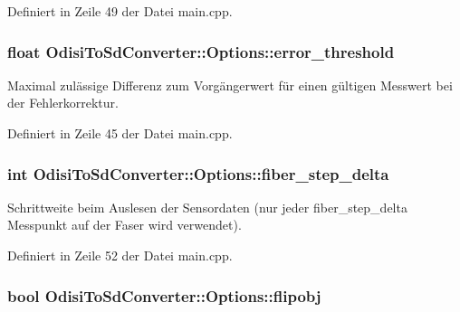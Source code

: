 Definiert in Zeile 49 der Datei main.\-cpp.

\hypertarget{structOdisiToSdConverter_1_1Options_a2d540b0bd36d458de7797792efb13f13}{
\subsubsection[{error\-\_\-threshold}]{\setlength{\rightskip}{0pt plus 5cm}float Odisi\-To\-Sd\-Converter\-::\-Options\-::error\-\_\-threshold}}\label{structOdisiToSdConverter_1_1Options_a2d540b0bd36d458de7797792efb13f13}


Maximal zulässige Differenz zum Vorgängerwert für einen gültigen Messwert bei der Fehlerkorrektur. 



Definiert in Zeile 45 der Datei main.\-cpp.

\hypertarget{structOdisiToSdConverter_1_1Options_a550a9730db03bc568f8ac51a269dd286}{
\subsubsection[{fiber\-\_\-step\-\_\-delta}]{\setlength{\rightskip}{0pt plus 5cm}int Odisi\-To\-Sd\-Converter\-::\-Options\-::fiber\-\_\-step\-\_\-delta}}\label{structOdisiToSdConverter_1_1Options_a550a9730db03bc568f8ac51a269dd286}


Schrittweite beim Auslesen der Sensordaten (nur jeder fiber\-\_\-step\-\_\-delta Messpunkt auf der Faser wird verwendet). 



Definiert in Zeile 52 der Datei main.\-cpp.

\hypertarget{structOdisiToSdConverter_1_1Options_a0117562823f70067df979f4975e5b076}{
\subsubsection[{flipobj}]{\setlength{\rightskip}{0pt plus 5cm}bool Odisi\-To\-Sd\-Converter\-::\-Options\-::flipobj}}\label{structOdisiToSdConverter_1_1Options_a0117562823f70067df979f4975e5b076}


